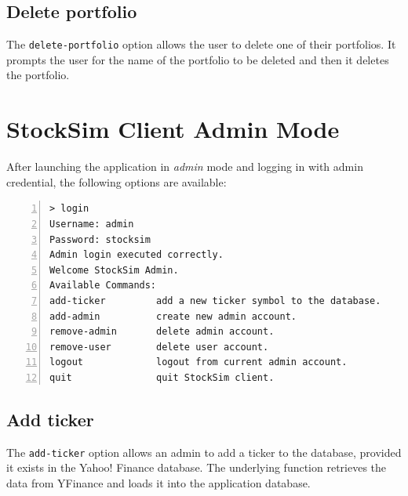 \subsection{Delete portfolio}
The \texttt{delete-portfolio} option allows the user to delete one of their portfolios. It prompts the user for the name of the portfolio to be deleted and then it deletes the portfolio.

\section{StockSim Client Admin Mode}

After launching the application in \textit{admin} mode and logging in with admin credential, the following options are available:

\begin{lstlisting}[basicstyle=\footnotesize\ttfamily,language={},numbers=left,
numberstyle=\footnotesize,numbersep=8pt,frame=single]
> login
Username: admin
Password: stocksim
Admin login executed correctly.
Welcome StockSim Admin.
Available Commands:
add-ticker         add a new ticker symbol to the database.
add-admin          create new admin account.                                                                                                                                                                     
remove-admin       delete admin account.                                                                                                                                                                         
remove-user        delete user account.                                                                                                                                                                          
logout             logout from current admin account.                                                                                                                                                            
quit               quit StockSim client.  
\end{lstlisting}

\subsection{Add ticker}
The \texttt{add-ticker} option allows an admin to add a ticker to the database, provided it exists in the Yahoo! Finance database.
The underlying function retrieves the data from YFinance and loads it into the application database.

